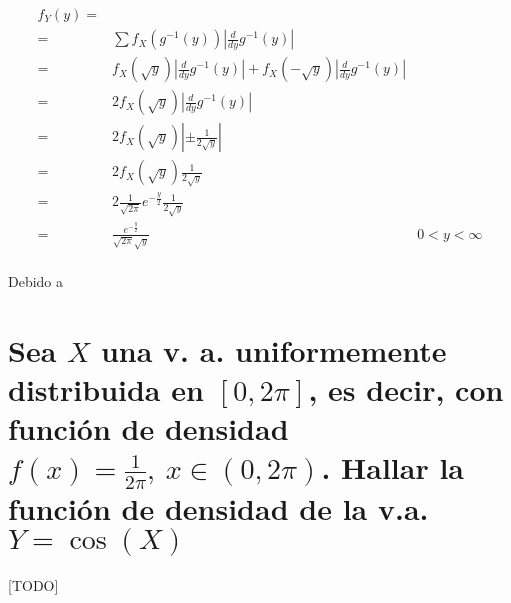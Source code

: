 \documentclass{article}
\begin{document}
    \begin{align}
      f_Y (y) =& &\\
              =& \sum f_X \left( g^{-1} (y) \right) \left| \frac{d}{dy} g^{-1} (y) \right| &\\
              =& f_X \left( \sqrt{y} \right) \left| \frac{d}{dy} g^{-1} (y) \right| + f_X \left( - \sqrt{y} \right) \left| \frac{d}{dy} g^{-1} (y) \right| &\\
              =& 2f_X \left( \sqrt{y} \right) \left| \frac{d}{dy} g^{-1} (y) \right| &\\
              =& 2f_X \left( \sqrt{y} \right) \left| \pm \frac{1}{2\sqrt{y}} \right| &\\
              =& 2f_X \left( \sqrt{y} \right) \frac{1}{2\sqrt{y}} &\\
              =& 2\frac{1}{\sqrt{2\pi} } e^{-\frac{y}{2}} \frac{1}{2\sqrt{y}}  & \\
              =& \frac{e^{-\frac{y}{2}}}{ \sqrt{2\pi} \sqrt{y} } & 0<y<\infty
    \end{align}

    \begin{figure}
      \center
      \caption{}
      \label{}
    \end{figure}

    \paragraph{}
    Debido a

  \section{Sea $X$ una v. a. uniformemente distribuida en $[0,2\pi]$, es decir, con función de densidad $f(x)=\frac{1}{2\pi}, \ x \in (0,2\pi)$. Hallar la función de densidad de la v.a. $Y = \cos(X)$}

    \paragraph{}
    [TODO]
\end{document}
